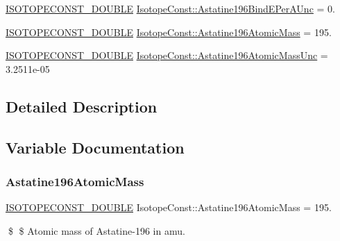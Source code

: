 \begin{DoxyCompactItemize}
\mbox{\hyperlink{group___isotope_const-_macros_ga8f45a7272ce02c0b4c65c44636ed719a}{I\+S\+O\+T\+O\+P\+E\+C\+O\+N\+S\+T\+\_\+\+D\+O\+U\+B\+LE}} \mbox{\hyperlink{group___isotope_const-_astatine-_at196_ga36f0faa143ff537f47cdcf969e45f616}{Isotope\+Const\+::\+Astatine196\+Bind\+E\+Per\+A\+Unc}} = 0.
\item 
\mbox{\hyperlink{group___isotope_const-_macros_ga8f45a7272ce02c0b4c65c44636ed719a}{I\+S\+O\+T\+O\+P\+E\+C\+O\+N\+S\+T\+\_\+\+D\+O\+U\+B\+LE}} \mbox{\hyperlink{group___isotope_const-_astatine-_at196_gad8a662ac5ca6cf5e4ea5adc12a59f226}{Isotope\+Const\+::\+Astatine196\+Atomic\+Mass}} = 195.
\item 
\mbox{\hyperlink{group___isotope_const-_macros_ga8f45a7272ce02c0b4c65c44636ed719a}{I\+S\+O\+T\+O\+P\+E\+C\+O\+N\+S\+T\+\_\+\+D\+O\+U\+B\+LE}} \mbox{\hyperlink{group___isotope_const-_astatine-_at196_gae2e3283444615c31306e2b970358ac42}{Isotope\+Const\+::\+Astatine196\+Atomic\+Mass\+Unc}} = 3.\+2511e-\/05
\end{DoxyCompactItemize}


\subsection{Detailed Description}


\subsection{Variable Documentation}
\mbox{\label{group___isotope_const-_astatine-_at196_gad8a662ac5ca6cf5e4ea5adc12a59f226}} 
\subsubsection{\texorpdfstring{Astatine196\+Atomic\+Mass}{Astatine196AtomicMass}}
{\footnotesize\ttfamily \mbox{\hyperlink{group___isotope_const-_macros_ga8f45a7272ce02c0b4c65c44636ed719a}{I\+S\+O\+T\+O\+P\+E\+C\+O\+N\+S\+T\+\_\+\+D\+O\+U\+B\+LE}} Isotope\+Const\+::\+Astatine196\+Atomic\+Mass = 195.}

\$ \$ Atomic mass of Astatine-\/196 in amu. \mbox{\label{group___isotope_const-_astatine-_at196_gae2e3283444615c31306e2b970358ac42}} 
